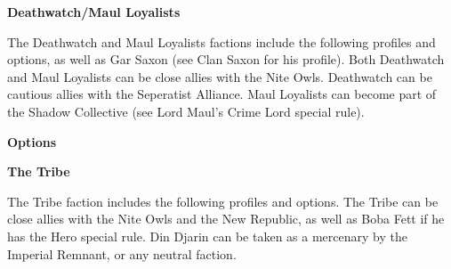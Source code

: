 \documentclass{article}
\begin{document}
\newpage

{\Large \textbf{Deathwatch/Maul Loyalists}}
\vspace{0.3cm}

\begin{minipage}{19cm}
    The Deathwatch and Maul Loyalists factions include the following profiles and
    options, as well as Gar Saxon (see Clan Saxon for his profile).
    Both Deathwatch and Maul Loyalists can be close allies with the Nite Owls.
    Deathwatch can be cautious allies with the Seperatist Alliance.
    Maul Loyalists can become part of the Shadow Collective (see Lord Maul's 
    Crime Lord special rule).
\end{minipage}

\vspace{0.3cm}
{\scriptsize
\setlength\extrarowheight{1.5pt}

}
\vspace{0.6cm}

{\large \textbf{Options}}
\vspace{0.3cm}
\begin{multicols}{2}
    {\scriptsize

    \setlength\extrarowheight{1.5pt}
    

    }
\end{multicols}
\vspace{0.6cm}

{\Large \textbf{The Tribe}}
\vspace{0.3cm}

\begin{minipage}{19cm}
    The Tribe faction includes the following profiles and options.
    The Tribe can be close allies with the Nite Owls and the New Republic, as well as
    Boba Fett if he has the Hero special rule.
    Din Djarin can be taken as a mercenary by the Imperial Remnant,
    or any neutral faction.
\end{minipage}

\vspace{0.3cm}
{\scriptsize
\setlength\extrarowheight{1.5pt}

}
\vspace{0.6cm}
\end{document}
